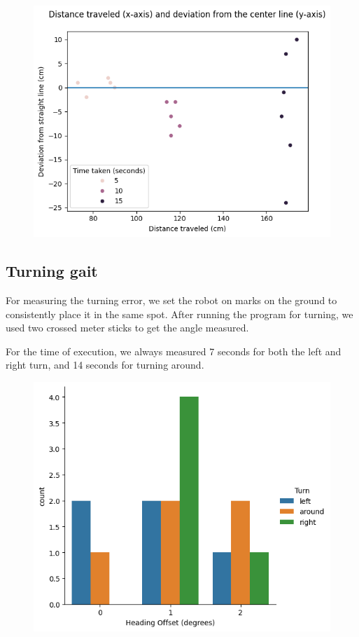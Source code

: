 \documentclass[11pt]{article}
\begin{document}
\begin{figure}[h!]
\includegraphics[width=140mm]{walk.png}
\centering
\end{figure}

\subsection*{Turning gait}

For measuring the turning error, we set the robot on marks on the ground to consistently place it in the same spot. After running the program for turning, we used two crossed meter sticks to get the angle measured. 

For the time of execution, we always measured 7 seconds for both the left and right turn, and 14 seconds for turning around.

\begin{figure}[h!]
\includegraphics[width=140mm]{offset.png}
\centering
\end{figure}
\end{document}
